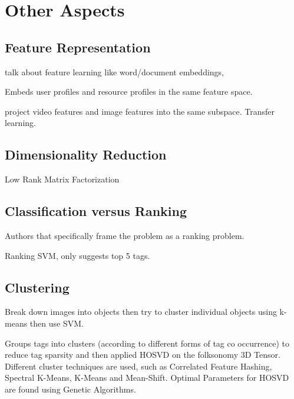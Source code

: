 \section{Other Aspects}\label{section:other_aspects}

\subsection{Feature Representation}

talk about feature learning like word/document embeddings, 

\cite{tatu_etal_2008} Embeds user profiles and resource profiles in the same feature space.

\cite{han_etal_2010} project video features and image features into the same subspace. Transfer learning.

\subsection{Dimensionality Reduction}

\cite{song_etal_2008} Low Rank Matrix Factorization

\subsection{Classification versus Ranking}

Authors that specifically frame the problem as a ranking problem.

\cite{sigurbjoernsson_zwol_2008}

\cite{chen_etal_2008}

\cite{cao_etal_2009} Ranking SVM, only suggests top 5 tags.

\cite{song_etal_2008,song_etal_2011}

\cite{belem_etal_2014}


\subsection{Clustering}

\cite{nikolopoulos_etal_2009} Break down images into objects then try to cluster individual objects using k-means then use SVM.

\cite{leginus_etal_2012} Groups tags into clusters (according to different forms of tag co occurrence) to reduce tag sparsity and then applied HOSVD on the folksonomy 3D Tensor.
Different cluster techniques are used, such as Correlated Feature Hashing, Spectral K-Means, K-Means and Mean-Shift. Optimal Parameters for HOSVD are found using Genetic Algorithms.




